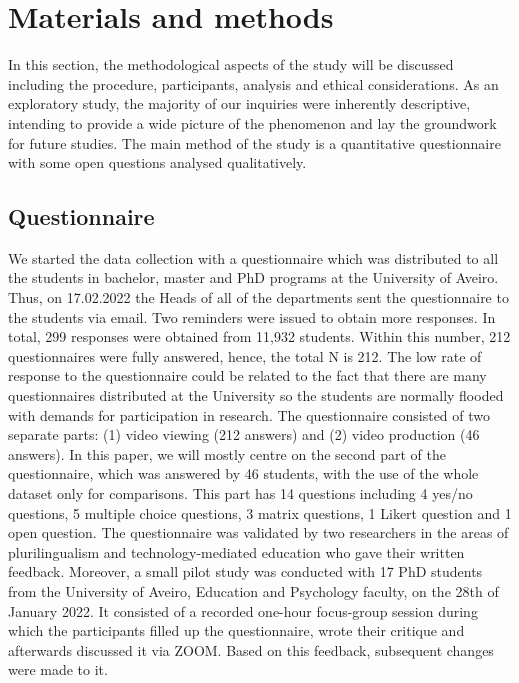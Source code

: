 \section{Materials and methods}\label{sec-materialsand}

In this section, the methodological aspects of the study will be
discussed including the procedure, participants, analysis and ethical
considerations. As an exploratory study, the majority of our inquiries
were inherently descriptive, intending to provide a wide picture of the
phenomenon and lay the groundwork for future studies. The main method of
the study is a quantitative questionnaire with some open questions
analysed qualitatively.

\subsection{Questionnaire}\label{sub-sec-questionnaire}

We started the data collection with a questionnaire which was
distributed to all the students in bachelor, master and PhD programs at
the University of Aveiro. Thus, on 17.02.2022 the Heads of all of the
departments sent the questionnaire to the students via email. Two
reminders were issued to obtain more responses. In total, 299 responses
were obtained from 11,932 students. Within this number, 212
questionnaires were fully answered, hence, the total N is 212. The low
rate of response to the questionnaire could be related to the fact that
there are many questionnaires distributed at the University so the
students are normally flooded with demands for participation in
research. The questionnaire consisted of two separate parts: (1) video
viewing (212 answers) and (2) video production (46 answers). In this
paper, we will mostly centre on the second part of the questionnaire,
which was answered by 46 students, with the use of the whole dataset
only for comparisons. This part has 14 questions including 4 yes/no
questions, 5 multiple choice questions, 3 matrix questions, 1 Likert
question and 1 open question. The questionnaire was validated by two
researchers in the areas of plurilingualism and technology-mediated
education who gave their written feedback. Moreover, a small pilot study
was conducted with 17 PhD students from the University of Aveiro,
Education and Psychology faculty, on the 28th of January 2022. It
consisted of a recorded one-hour focus-group session during which the
participants filled up the questionnaire, wrote their critique and
afterwards discussed it via ZOOM. Based on this feedback, subsequent
changes were made to it.

